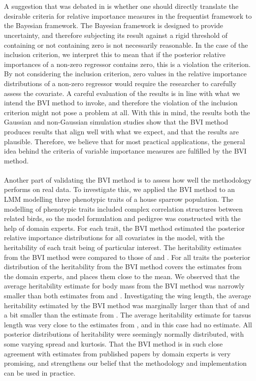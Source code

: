 \\
\\
A suggestion that was debated in \citep{Arnstad:Relative_variable_importance_in_Bayesian_linear_mixed_models:2024} is whether one should directly translate the desirable criteria for relative importance measures in the frequentist framework to the Bayesian framework. The Bayesian framework is designed to provide uncertainty, and therefore subjecting its result against a rigid threshold of containing or not containing zero is not necessarily reasonable. In the case of the inclusion criterion, we interpret this to mean that if the posterior relative importances of a non-zero regressor contains zero, this is a violation the criterion. By not considering the inclusion criterion, zero values in the relative importance distributions of a non-zero regressor would require the researcher to carefully assess the covariate. A careful evaluation of the results is in line with what we intend the BVI method to invoke, and therefore the violation of the inclusion criterion might not pose a problem at all. With this in mind, the results both the Gaussian and non-Gaussian simulation studies show that the BVI method produces results that align well with what we expect, and that the results are plausible. Therefore, we believe that for most practical applications, the general idea behind the criteria of variable importance measures are fulfilled by the BVI method. 
\\
\\
Another part of validating the BVI method is to assess how well the methodology performs on real data. To investigate this, we applied the BVI method to an LMM modelling three phenotypic traits of a house sparrow population. The modelling of phenotypic traits included complex correlation structures between related birds, so the model formulation and pedigree was constructed with the help of domain experts. For each trait, the BVI method estimated the posterior relative importance distributions for all covariates in the model, with the heritability of each trait being of particular interest. The heritability estimates from the BVI method were compared to those of \citet{Silva2017} and \citet{Muff2019Genetic}. For all traits the posterior distribution of the heritability from the BVI method covers the estimates from the domain experts, and places them close to the mean. We observed that the average heritability estimate for body mass from the BVI method was narrowly smaller than both estimates from \citet{Silva2017} and \citet{Muff2019Genetic}. Investigating the wing length, the average heritability estimated by the BVI method was marginally larger than that of \citet{Muff2019Genetic} and a bit smaller than the estimate from \citet{Silva2017}. The average heritability estimate for tarsus length was very close to the estimates from \citet{Silva2017}, and in this case \citet{Muff2019Genetic} had no estimate. All posterior distributions of heritability were seemingly normally distributed, with some varying spread and kurtosis. That the BVI method is in such close agreement with estimates from published papers by domain experts is very promising, and strengthens our belief that the methodology and implementation can be used in practice.

